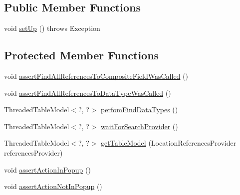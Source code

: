 \subsection*{Public Member Functions}
\begin{DoxyCompactItemize}
\item 
void \mbox{\hyperlink{classghidra_1_1app_1_1plugin_1_1core_1_1decompile_1_1_abstract_decompiler_find_references_action_test_a1d1d74a3f84043df9d9c4053dad5688d}{set\+Up}} ()  throws Exception 
\end{DoxyCompactItemize}
\subsection*{Protected Member Functions}
\begin{DoxyCompactItemize}
\item 
void \mbox{\hyperlink{classghidra_1_1app_1_1plugin_1_1core_1_1decompile_1_1_abstract_decompiler_find_references_action_test_ab9649213e2f76913f52fcbb9bf2c602b}{assert\+Find\+All\+References\+To\+Composite\+Field\+Was\+Called}} ()
\item 
void \mbox{\hyperlink{classghidra_1_1app_1_1plugin_1_1core_1_1decompile_1_1_abstract_decompiler_find_references_action_test_aedb707fa1d0bc095ddb1545409c14e1c}{assert\+Find\+All\+References\+To\+Data\+Type\+Was\+Called}} ()
\item 
Threaded\+Table\+Model$<$?, ?$>$ \mbox{\hyperlink{classghidra_1_1app_1_1plugin_1_1core_1_1decompile_1_1_abstract_decompiler_find_references_action_test_ac6f76cbf407c1f824b8859cd8fdb6889}{perfom\+Find\+Data\+Types}} ()
\item 
Threaded\+Table\+Model$<$?, ?$>$ \mbox{\hyperlink{classghidra_1_1app_1_1plugin_1_1core_1_1decompile_1_1_abstract_decompiler_find_references_action_test_a1c0949f31fc841f8f6bcfd44a1ed33c9}{wait\+For\+Search\+Provider}} ()
\item 
Threaded\+Table\+Model$<$?, ?$>$ \mbox{\hyperlink{classghidra_1_1app_1_1plugin_1_1core_1_1decompile_1_1_abstract_decompiler_find_references_action_test_ab222409e434c109cfeb9d28de92365b9}{get\+Table\+Model}} (Location\+References\+Provider references\+Provider)
\item 
void \mbox{\hyperlink{classghidra_1_1app_1_1plugin_1_1core_1_1decompile_1_1_abstract_decompiler_find_references_action_test_ad05621fc0e04e0d55f9aafae24f78f6f}{assert\+Action\+In\+Popup}} ()
\item 
void \mbox{\hyperlink{classghidra_1_1app_1_1plugin_1_1core_1_1decompile_1_1_abstract_decompiler_find_references_action_test_aa9abfadbd327de808a621ef3a7b1e896}{assert\+Action\+Not\+In\+Popup}} ()
\end{DoxyCompactItemize}
